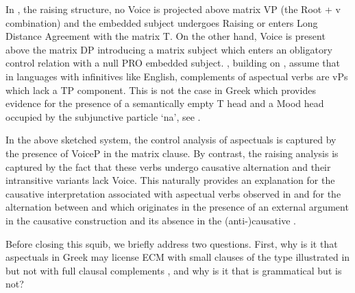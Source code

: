 \documentclass[output=paper]{langscibook}
\begin{document}
In , the raising structure, no Voice is projected above matrix VP (the Root + v combination) 
and the embedded subject undergoes Raising or enters Long Distance Agreement with the matrix T. 
On the other hand, Voice is present above the matrix DP introducing a matrix subject which enters an obligatory control relation with a null PRO embedded subject. 
\citet{MourounasWilliamson2019}, building on \citet{wurmbrand2001,Wurmbrand2002,Wurmbrand2014}, assume that in languages with infinitives like English, complements of aspectual verbs are vPs which lack a TP component. 
This is not the case in Greek which provides evidence for the presence of a semantically empty T head 
and a Mood head occupied by the subjunctive particle ‘na’, see \citet{AlexiadouAnagnostopoulouToapp}. 

In the above sketched system, the control analysis of aspectuals is captured by the presence of VoiceP in the matrix clause. 
By contrast, the raising analysis is captured by the fact that these verbs undergo causative alternation and their intransitive variants lack Voice. 
This naturally provides an explanation for the causative interpretation associated with aspectual verbs observed in  
and for the alternation between  and  
which originates in the presence of an external argument in the causative construction  
and its absence in the (anti-)causative . 

Before closing this squib, we briefly address two questions. 
First, why is it that aspectuals in Greek may license ECM with small clauses of the type illustrated in  
but not with full clausal complements , and why is it that  is grammatical but  is not?

\ea%
    \label{alexiadouex:key:19}
    \z
\z 
\end{document}

